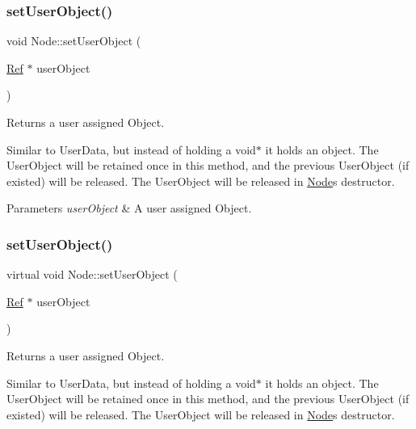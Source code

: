 \subsubsection{\texorpdfstring{set\+User\+Object()}{setUserObject()}\hspace{0.1cm}{\footnotesize\ttfamily [1/2]}}
{\footnotesize\ttfamily void Node\+::set\+User\+Object (\begin{DoxyParamCaption}\item[{\hyperlink{classRef}{Ref} $\ast$}]{user\+Object }\end{DoxyParamCaption})\hspace{0.3cm}{\ttfamily [virtual]}}

Returns a user assigned Object.

Similar to User\+Data, but instead of holding a void$\ast$ it holds an object. The User\+Object will be retained once in this method, and the previous User\+Object (if existed) will be released. The User\+Object will be released in \hyperlink{classNode}{Node}\textquotesingle{}s destructor.


\begin{DoxyParams}{Parameters}
{\em user\+Object} & A user assigned Object. \\
\hline
\end{DoxyParams}
\mbox{\label{classNode_a306c369ecb71feb0206b277d9bf81fab}} 
\subsubsection{\texorpdfstring{set\+User\+Object()}{setUserObject()}\hspace{0.1cm}{\footnotesize\ttfamily [2/2]}}
{\footnotesize\ttfamily virtual void Node\+::set\+User\+Object (\begin{DoxyParamCaption}\item[{\hyperlink{classRef}{Ref} $\ast$}]{user\+Object }\end{DoxyParamCaption})\hspace{0.3cm}{\ttfamily [virtual]}}

Returns a user assigned Object.

Similar to User\+Data, but instead of holding a void$\ast$ it holds an object. The User\+Object will be retained once in this method, and the previous User\+Object (if existed) will be released. The User\+Object will be released in \hyperlink{classNode}{Node}\textquotesingle{}s destructor.


